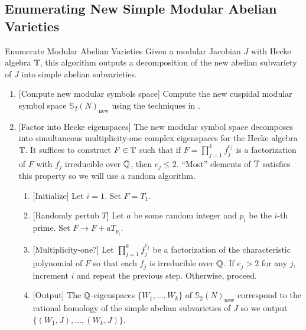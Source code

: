 \documentclass{article}
\begin{document}

\subsection{Enumerating New Simple Modular Abelian Varieties}

\begin{algorithm}{Enumerate Modular Abelian Varieties}
    \label{alg:new_simple_subs}
    Given a modular Jacobian $J$ with Hecke algebra $\mathbb{T}$, this algorithm
    outputs a decomposition of the new abelian subvariety of $J$ into simple
    abelian subvarieties.
    \begin{enumerate}
        \item{} [Compute new modular symbols space]
            Compute the new cuspidal modular symbol space
            $\mathbb{S}_2(N)_\mathrm{new}$ using the techniques in \cite[\S
            8]{stein:modular_forms:2007}.
        \item{} [Factor into Hecke eigenspaces]
            The new modular symbol space decomposes into simultaneous
            multiplicity-one complex eigenspaces for the Hecke algebra $\mathbb{T}$.
            It suffices to construct $F\in \mathbb{T}$ such that if $F = \prod_{j=1} ^k f_j
            ^{e_j}$ is a factorization of $F$ with $f_j$ irreducible over
            $\mathbb{Q}$, then $e_j\leq 2$. ``Most'' elements of $\mathbb{T}$ satisfies this
            property so we will use a random algorithm.
            \begin{enumerate}
                \item{} [Initialize]
                    Let $i=1$. Set $F=T_1$.
                \item{} [Randomly pertub $T$]
                    Let $a$ be some random integer and $p_i$ be the $i$-th
                    prime. Set $F\to F+aT_{p_i}$.
                \item{} [Multiplicity-one?]
                    Let $\prod_{j=1} ^k f_j ^{e_j}$ be a factorization of the
                    characteristic polynomial of $F$ so that each $f_j$ is
                    irreducible over $\mathbb{Q}$. If $e_j>2$ for any $j$, increment
                    $i$ and repeat the previous step. Otherwise, proceed.
                \item{} [Output]
                    The $\mathbb{Q}$-eigenspaces $\{W_1,\ldots,W_k\}$ of
                    $\mathbb{S}_2(N)_\mathrm{new}$ correspond to the rational
                    homology of the simple abelian subvarieties of $J$ so we
                    output $\{(W_1, J), \ldots, (W_k, J)\}$.
            \end{enumerate}
    \end{enumerate}
\end{algorithm}
\end{document}
